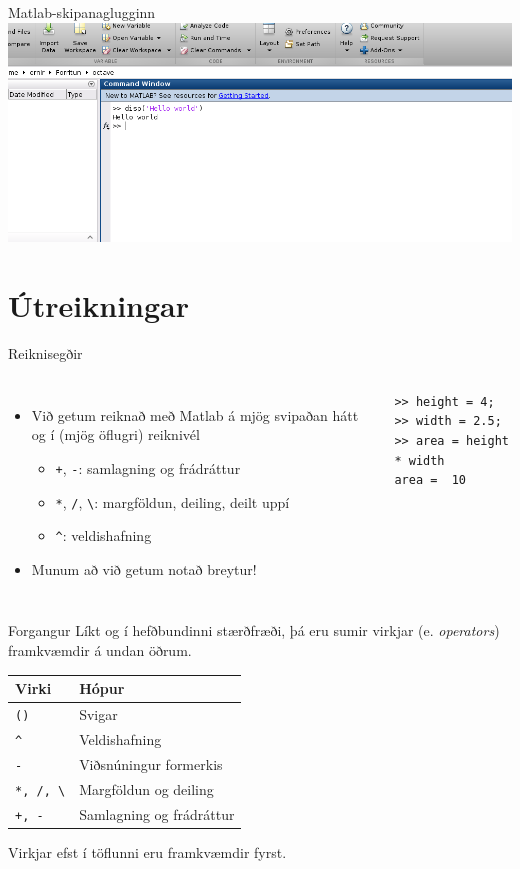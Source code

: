 \documentclass[handout]{beamer}
\begin{document}
\begin{frame}{Matlab-skipanaglugginn}
\includegraphics[width=\textwidth]{Pics/command-window-hello-world}
\end{frame}

\section{Útreikningar}

\begin{frame}[fragile]{Reiknisegðir}
\begin{columns}
\begin{itemize}
 \item Við getum reiknað með Matlab á mjög svipaðan hátt og í (mjög öflugri) reiknivél
 \begin{itemize}
  \item \texttt{+}, \texttt{-}: samlagning og frádráttur
  \item \texttt{*}, \texttt{/}, \texttt{\textbackslash}: margföldun, deiling, deilt uppí
  \item \texttt{\^}: veldishafning
 \end{itemize}
 \item Munum að við getum notað breytur!
\end{itemize}
\begin{verbatim}
>> height = 4;
>> width = 2.5;
>> area = height * width
area =  10
\end{verbatim}
\end{columns}
\end{frame}

\begin{frame}{Forgangur}
Líkt og í hefðbundinni stærðfræði, þá eru sumir virkjar (e. \emph{operators}) framkvæmdir á undan öðrum.
\begin{center}
\begin{tabular}{ll}
\toprule
Virki&Hópur\\
\midrule
\texttt{()}&Svigar\\
\texttt{\^}&Veldishafning\\
\texttt{-}&Viðsnúningur formerkis\\
\texttt{*, /, \textbackslash}&Margföldun og deiling\\
\texttt{+, -}&Samlagning og frádráttur\\
\bottomrule
\end{tabular}
\end{center}
Virkjar efst í töflunni eru framkvæmdir fyrst.
\end{frame}
\end{document}
